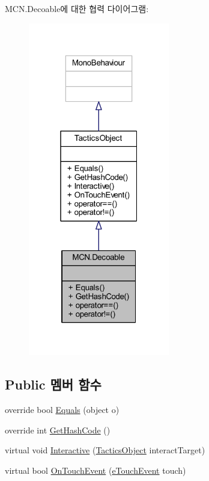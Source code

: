 M\+C\+N.\+Decoable에 대한 협력 다이어그램\+:\nopagebreak
\begin{figure}[H]
\begin{center}
\leavevmode
\includegraphics[width=175pt]{class_m_c_n_1_1_decoable__coll__graph}
\end{center}
\end{figure}
\subsection*{Public 멤버 함수}
\begin{DoxyCompactItemize}
\item 
override bool \hyperlink{class_m_c_n_1_1_decoable_a7c14e3879800d1f5d7e58a02e75540d9}{Equals} (object o)
\item 
override int \hyperlink{class_m_c_n_1_1_decoable_ad3068f4dce16b691595d54bb2f7a2d5c}{Get\+Hash\+Code} ()
\item 
virtual void \hyperlink{class_tactics_object_a5f94ed01497a7072a2785163f4cbc57b}{Interactive} (\hyperlink{class_tactics_object}{Tactics\+Object} interact\+Target)
\item 
virtual bool \hyperlink{class_tactics_object_af34052e62ea471d21e4c601cc79ff717}{On\+Touch\+Event} (\hyperlink{_touch_manager_8cs_ae33e321a424fe84ba8b2fdb81ad40a68}{e\+Touch\+Event} touch)
\end{DoxyCompactItemize}
